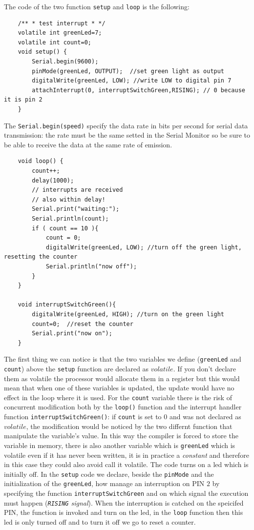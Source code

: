\documentclass[10pt,a4paper]{report}
\theoremstyle{definition}
\begin{document}
The code of the two function \texttt{setup} and \texttt{loop} is the following:
\begin{lstlisting}
	/** * test interrupt * */ 
	volatile int greenLed=7; 
	volatile int count=0; 
	void setup() { 
		Serial.begin(9600); 
		pinMode(greenLed, OUTPUT);  //set green light as output
		digitalWrite(greenLed, LOW); //write LOW to digital pin 7
		attachInterrupt(0, interruptSwitchGreen,RISING); // 0 because it is pin 2 
	}
\end{lstlisting}

The \texttt{Serial.begin(speed)} specify the data rate in bits per second for serial data transmission: the rate must be the same setted in the Serial Monitor so be sure to be able to receive the data at the same rate of emission.
\begin{lstlisting}
	void loop() { 
		count++; 
		delay(1000); 
		// interrupts are received 
		// also within delay!
		Serial.print("waiting:");
		Serial.println(count);
		if ( count == 10 ){ 
			count = 0; 
			digitalWrite(greenLed, LOW); //turn off the green light, resetting the counter
			Serial.println("now off");
		} 
	}
	
	void interruptSwitchGreen(){ 
		digitalWrite(greenLed, HIGH); //turn on the green light
		count=0;  //reset the counter
		Serial.print("now on");
	}
\end{lstlisting}

The first thing we can notice is that the two variables we define (\texttt{greenLed} and \texttt{count}) above the \texttt{setup} function are declared as $volatile$. If you don't declare them as volatile the processor would allocate them in a register but this would mean that when one of these variables is updated, the update would have no effect in the loop where it is used. For the \texttt{count} variable there is the risk of concurrent modification both by the \texttt{loop()} function and the interrupt handler function \texttt{interruptSwitchGreen()}: if \texttt{count} is set to $0$ and was not declared as $volatile$, the modification would be noticed by the two differnt function that manipulate the variable's value.
In this way the compiler is forced to store the variable in memory, there is also another variable which is \texttt{greenLed} which is volatile even if it has never been written, it is in practice a \textit{constant} and therefore in this case they could also avoid call it volatile.
The code turns on a led which is initially off. In the \texttt{setup} code we declare, beside the \texttt{pinMode} and the initialization of the \texttt{greenLed}, how manage an interruption on PIN $2$ by specifying the function \texttt{interruptSwitchGreen} and on which signal the execution must happen (\textit{\texttt{RISING} signal}). When the interruption is catched on the speicifed PIN, the function is invoked and turn on the led, in the \texttt{loop} function then this led is only turned off and to turn it off we go to reset a counter.
\end{document}
